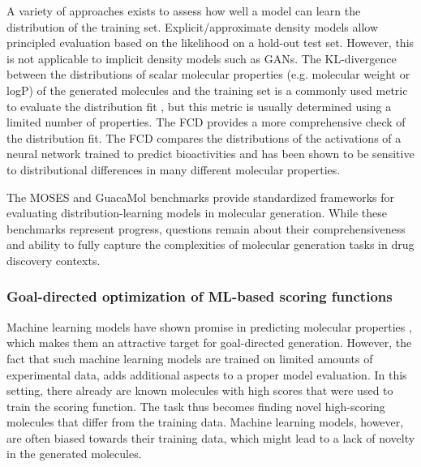 A variety of approaches exists to assess how well a model can learn the distribution of the training
set. Explicit/approximate density models allow principled evaluation based on the likelihood on a
hold-out test set. However, this is not applicable to implicit density models such as \acp{GAN}.
The KL-divergence between the distributions of scalar molecular properties (e.g. molecular weight or
logP) of the generated molecules and the training set is a commonly used metric to evaluate the
distribution fit \citep{brownGuacaMolBenchmarkingModels2019,polykovskiyMolecularSetsMOSES2020}, but
this metric is usually determined using a limited number of properties. The \ac{FCD}
\citep{preuerFrechetChemNetDistance2018} provides a more comprehensive check of the distribution
fit. The \ac{FCD} compares the distributions of the activations of a neural network trained to
predict bioactivities and has been shown to be sensitive to distributional differences in many
different molecular properties.

The MOSES \citep{polykovskiyMolecularSetsMOSES2020} and GuacaMol
\citep{brownGuacaMolBenchmarkingModels2019} benchmarks provide standardized frameworks for
evaluating distribution-learning models in molecular generation. While these benchmarks represent
progress, questions remain about their comprehensiveness and ability to fully capture the
complexities of molecular generation tasks in drug discovery contexts.

\subsubsection{Goal-directed optimization of ML-based scoring functions}
Machine learning models have shown promise in predicting molecular properties
\citep{mayrDeepToxToxicityPrediction2016,klambauerMachineLearningDrug2019,vamathevanApplicationsMachineLearning2019,chenRiseDeepLearning2018,stokesDeepLearningApproach2020},
which makes them an attractive target for goal-directed generation. However, the fact that such
machine learning models are trained on limited amounts of experimental data, adds additional aspects
to a proper model evaluation. In this setting, there already are known molecules with high scores
that were used to train the scoring function. The task thus becomes finding novel
high-scoring molecules that differ from the training data. Machine learning models, however, are
often biased towards their training data, which might lead to a lack of novelty in the generated
molecules.

